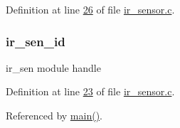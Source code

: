 Definition at line \hyperlink{a00045_source_l00026}{26} of file \hyperlink{a00045_source}{ir\+\_\+sensor.\+c}.

\hypertarget{a00017_a624782f67b3870f0dde83528770ef5fc}{
\subsubsection[{ir\+\_\+sen\+\_\+id}]{ ir\+\_\+sen\+\_\+id}}\label{a00017_a624782f67b3870f0dde83528770ef5fc}


ir\+\_\+sen module handle 



Definition at line \hyperlink{a00045_source_l00023}{23} of file \hyperlink{a00045_source}{ir\+\_\+sensor.\+c}.



Referenced by \hyperlink{a00048_source_l00080}{main()}.

